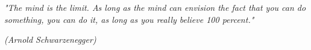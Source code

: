 
\begin{epigrafe}
\textit{"The mind is the limit. As long as the mind can envision the fact that you can do something, you can do it, as long as you really believe 100 percent."}

\hfill{\textit{(Arnold Schwarzenegger)}}
\end{epigrafe}




